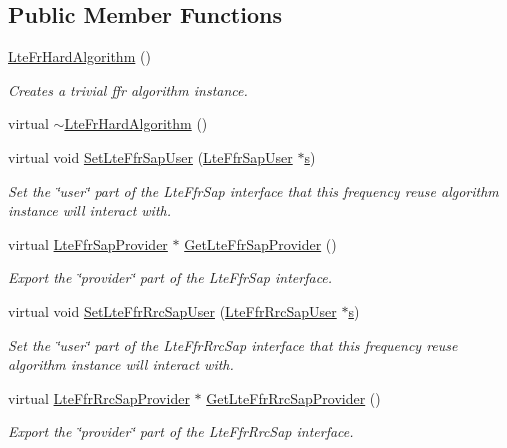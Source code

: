 \subsection*{Public Member Functions}
\begin{DoxyCompactItemize}
\item 
\hyperlink{classns3_1_1LteFrHardAlgorithm_ab7824e5be6007926f5f875676e160185}{Lte\+Fr\+Hard\+Algorithm} ()
\begin{DoxyCompactList}\small\item\em Creates a trivial ffr algorithm instance. \end{DoxyCompactList}\item 
virtual \hyperlink{classns3_1_1LteFrHardAlgorithm_a720ffe9b7615c264ebb06a72ca70d865}{$\sim$\+Lte\+Fr\+Hard\+Algorithm} ()
\item 
virtual void \hyperlink{classns3_1_1LteFrHardAlgorithm_a9d09fa75860dd3a90a5c4cf65974cd1a}{Set\+Lte\+Ffr\+Sap\+User} (\hyperlink{classns3_1_1LteFfrSapUser}{Lte\+Ffr\+Sap\+User} $\ast$\hyperlink{generate__test__data__lte__sinr_8m_ad83eeb3a142285d1243a08c6b7026df8}{s})
\begin{DoxyCompactList}\small\item\em Set the \char`\"{}user\char`\"{} part of the Lte\+Ffr\+Sap interface that this frequency reuse algorithm instance will interact with. \end{DoxyCompactList}\item 
virtual \hyperlink{classns3_1_1LteFfrSapProvider}{Lte\+Ffr\+Sap\+Provider} $\ast$ \hyperlink{classns3_1_1LteFrHardAlgorithm_af8329cbe2362b1429722ddac87419e87}{Get\+Lte\+Ffr\+Sap\+Provider} ()
\begin{DoxyCompactList}\small\item\em Export the \char`\"{}provider\char`\"{} part of the Lte\+Ffr\+Sap interface. \end{DoxyCompactList}\item 
virtual void \hyperlink{classns3_1_1LteFrHardAlgorithm_a6e3490abcd18617713cae63e07b2f4fd}{Set\+Lte\+Ffr\+Rrc\+Sap\+User} (\hyperlink{classns3_1_1LteFfrRrcSapUser}{Lte\+Ffr\+Rrc\+Sap\+User} $\ast$\hyperlink{generate__test__data__lte__sinr_8m_ad83eeb3a142285d1243a08c6b7026df8}{s})
\begin{DoxyCompactList}\small\item\em Set the \char`\"{}user\char`\"{} part of the Lte\+Ffr\+Rrc\+Sap interface that this frequency reuse algorithm instance will interact with. \end{DoxyCompactList}\item 
virtual \hyperlink{classns3_1_1LteFfrRrcSapProvider}{Lte\+Ffr\+Rrc\+Sap\+Provider} $\ast$ \hyperlink{classns3_1_1LteFrHardAlgorithm_a0c5da852a518b9d006f3e79479f7df78}{Get\+Lte\+Ffr\+Rrc\+Sap\+Provider} ()
\begin{DoxyCompactList}\small\item\em Export the \char`\"{}provider\char`\"{} part of the Lte\+Ffr\+Rrc\+Sap interface. \end{DoxyCompactList}\end{DoxyCompactItemize}

